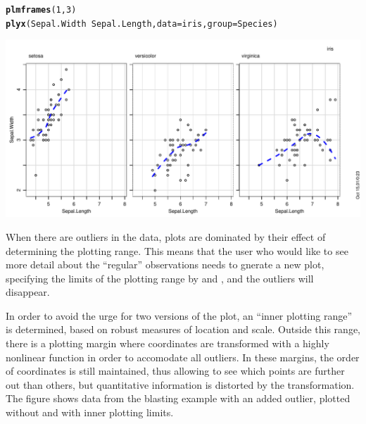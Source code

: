 \documentclass[11pt]{article}\usepackage[]{graphicx}\usepackage[]{color}
\makeatletter
\def\maxwidth{ %
  \ifdim\Gin@nat@width>\linewidth
    \linewidth
  \else
    \Gin@nat@width
  \fi
}
\newcommand{\hlnum}[1]{\textcolor[rgb]{0.686,0.059,0.569}{#1}}%
\newcommand{\hlopt}[1]{\textcolor[rgb]{0,0,0}{#1}}%
\newcommand{\hlstd}[1]{\textcolor[rgb]{0.345,0.345,0.345}{#1}}%
\newcommand{\hlkwc}[1]{\textcolor[rgb]{0.333,0.667,0.333}{#1}}%
\newcommand{\hlkwd}[1]{\textcolor[rgb]{0.737,0.353,0.396}{\textbf{#1}}}%
\newenvironment{kframe}{%
 \def\at@end@of@kframe{}%
 \ifinner\ifhmode%
  \def\at@end@of@kframe{\end{minipage}}%
  \begin{minipage}{\columnwidth}%
 \fi\fi%
 \def\FrameCommand##1{\hskip\@totalleftmargin \hskip-\fboxsep
 \colorbox{shadecolor}{##1}\hskip-\fboxsep
     \hskip-\linewidth \hskip-\@totalleftmargin \hskip\columnwidth}%
 \MakeFramed {\advance\hsize-\width
   \@totalleftmargin\z@ \linewidth\hsize
   \@setminipage}}%
 {\par\unskip\endMakeFramed%
 \at@end@of@kframe}
\newenvironment{knitrout}{}{} %
\makeatother
\begin{document}
\begin{knitrout}
\color{fgcolor}\begin{kframe}
\begin{alltt}
\hlkwd{plmframes}\hlstd{(}\hlnum{1}\hlstd{,}\hlnum{3}\hlstd{)}
\hlkwd{plyx}\hlstd{(Sepal.Width}\hlopt{~}\hlstd{Sepal.Length,} \hlkwc{data}\hlstd{=iris,} \hlkwc{group}\hlstd{=Species)}
\end{alltt}
\end{kframe}
\includegraphics[width=\maxwidth]{figure/plyx_group-1} 

\end{knitrout}

When there are outliers in the data, plots are dominated by their effect of
determining the plotting range. This means that the user who would like to
see more detail about the ``regular'' observations needs to gnerate a new
plot, specifying the limits of the plotting range by  and ,
and the outliers will disappear.

In order to avoid the urge for two versions of the plot, an ``inner
plotting range'' is determined, based on robust measures of 
location and scale. Outside this range, there is a plotting margin where
coordinates are transformed with a highly nonlinear function in order to
accomodate all outliers. 
In these margins, the order of coordinates is still maintained, thus
allowing to see which points are further out than others, but quantitative
information is distorted by the transformation.
The figure shows data from the blasting example with an added outlier,
plotted without and with inner plotting limits.
\end{document}
